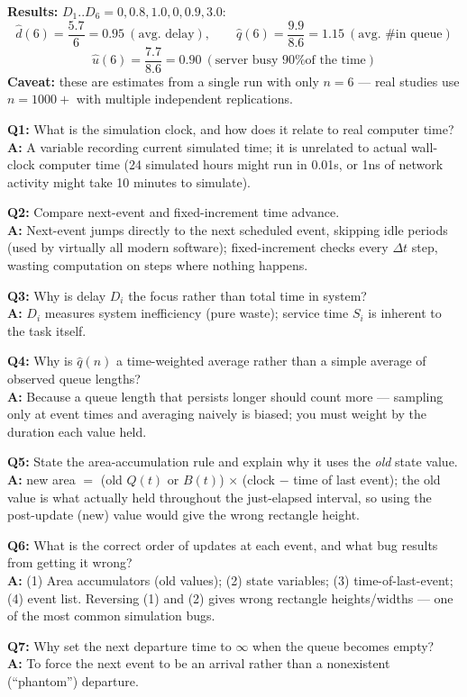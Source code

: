 \begin{examplebox}
\textbf{Results:} $D_1..D_6=0,0.8,1.0,0,0.9,3.0$:
\[
\hat d(6)=\frac{5.7}{6}=0.95 \ (\text{avg.\ delay}), \qquad \hat q(6)=\frac{9.9}{8.6}=1.15 \ (\text{avg.\ \# in queue})
\]
\[
\hat u(6)=\frac{7.7}{8.6}=0.90 \ (\text{server busy 90\% of the time})
\]
\textbf{Caveat:} these are estimates from a single run with only $n=6$ — real studies use $n=1000+$ with multiple independent replications.
\end{examplebox}

\begin{qabox}
\textbf{Q1:} What is the simulation clock, and how does it relate to real computer time? \\
\textbf{A:} A variable recording current simulated time; it is unrelated to actual wall-clock computer time (24 simulated hours might run in 0.01s, or 1ns of network activity might take 10 minutes to simulate).

\textbf{Q2:} Compare next-event and fixed-increment time advance. \\
\textbf{A:} Next-event jumps directly to the next scheduled event, skipping idle periods (used by virtually all modern software); fixed-increment checks every $\Delta t$ step, wasting computation on steps where nothing happens.

\textbf{Q3:} Why is delay $D_i$ the focus rather than total time in system? \\
\textbf{A:} $D_i$ measures system inefficiency (pure waste); service time $S_i$ is inherent to the task itself.

\textbf{Q4:} Why is $\hat q(n)$ a time-weighted average rather than a simple average of observed queue lengths? \\
\textbf{A:} Because a queue length that persists longer should count more — sampling only at event times and averaging naively is biased; you must weight by the duration each value held.

\textbf{Q5:} State the area-accumulation rule and explain why it uses the \emph{old} state value. \\
\textbf{A:} new area $=$ (old $Q(t)$ or $B(t)$) $\times$ (clock $-$ time of last event); the old value is what actually held throughout the just-elapsed interval, so using the post-update (new) value would give the wrong rectangle height.

\textbf{Q6:} What is the correct order of updates at each event, and what bug results from getting it wrong? \\
\textbf{A:} (1) Area accumulators (old values); (2) state variables; (3) time-of-last-event; (4) event list. Reversing (1) and (2) gives wrong rectangle heights/widths — one of the most common simulation bugs.

\textbf{Q7:} Why set the next departure time to $\infty$ when the queue becomes empty? \\
\textbf{A:} To force the next event to be an arrival rather than a nonexistent (``phantom'') departure.
\end{qabox}

